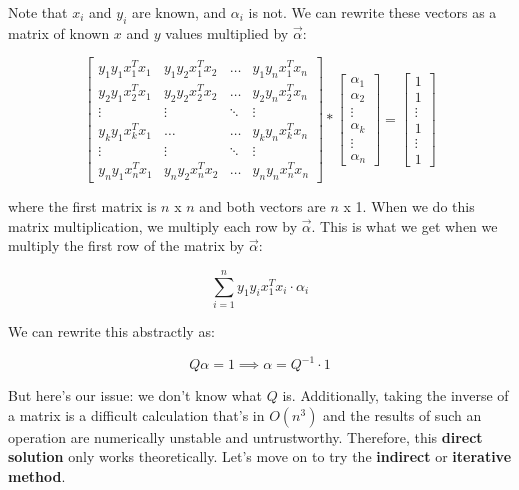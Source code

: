 Note that $x_i$ and $y_i$ are known, and $\alpha_i$ is not. We can rewrite these vectors as a matrix of known $x$ and $y$ values multiplied by $\vec{\alpha}$:

\begin{equation}
\begin{bmatrix} 
y_1 y_1 x_1^T x_1 & y_1 y_2 x_1^T x_2 & \dots & y_1 y_n x_1^T x_n \\
y_2 y_1 x_2^T x_1 & y_2 y_2 x_2^T x_2 & \dots & y_2 y_n x_2^T x_n \\
\vdots & \vdots & \ddots & \vdots \\
y_k y_1 x_k^T x_1 & \dots & \dots & y_k y_n x_k^T x_n\\
\vdots & \vdots & \ddots & \vdots \\
y_n y_1 x_n^T x_1 & y_n y_2 x_n^T x_2 & \dots & y_n y_n x_n^T x_n
\end{bmatrix}
    *
    \begin{bmatrix}
        \alpha_1\\
        \alpha_2\\
        \vdots\\
        \alpha_k\\
        \vdots\\
        \alpha_n
    \end{bmatrix} 
    = 
    \begin{bmatrix}
    1\\
    1\\
    \vdots\\
    1\\
    \vdots\\
    1
\end{bmatrix}
\end{equation}

where the first matrix is $n$ x $n$ and both vectors are $n$ x 1. When we do this matrix multiplication, we multiply each row by $\vec{\alpha}$. This is what we get when we multiply the first row of the matrix by $\vec{\alpha}$:

\[
\sum\limits_{i=1}^{n} y_1 y_i x_1 ^T x_i \cdot \alpha_i
\]

We can rewrite this abstractly as:

\[
Q \alpha = 1 \implies \alpha = Q^{-1} \cdot 1
\]

But here's our issue: we don't know what $Q$ is. Additionally, taking the inverse of a matrix is a difficult calculation that's in $O(n^3)$ and the results of such an operation are numerically unstable and untrustworthy. Therefore, this \textbf{direct solution} only works theoretically. Let's move on to try the \textbf{indirect} or \textbf{iterative method}.

